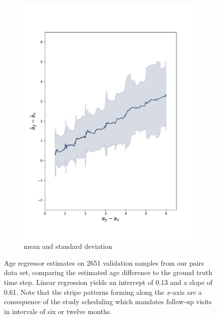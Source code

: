 \begin{figure}[h]
\begin{subfigure}{0.48\textwidth}
		\includegraphics[width=\linewidth, trim={18 30 30 30}, clip]{images/age_plots/d_dhat_rolling_real} 
		\vspace{-20pt}
		\caption{mean and standard deviation}
	\end{subfigure}
	 
	\caption{Age regressor estimates on 2651 validation samples from our pairs data set, comparing the estimated age difference to the ground truth time step. Linear regression yields an intercept of 0.13 and a slope of 0.61. Note that the stripe patterns forming along the $x$-axis are a consequence of the study scheduling which mandates follow-up visits in intervals of six or twelve months.}
	\label{fig:expregddhat}
\end{figure}

